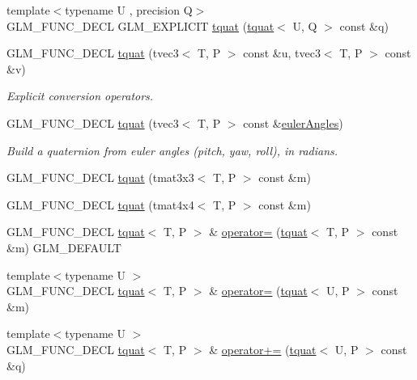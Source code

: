 \begin{DoxyCompactItemize}
\item 
{\footnotesize template$<$typename U , precision Q$>$ }\\G\+L\+M\+\_\+\+F\+U\+N\+C\+\_\+\+D\+E\+C\+L G\+L\+M\+\_\+\+E\+X\+P\+L\+I\+C\+I\+T \hyperlink{structglm_1_1tquat_a2595e543aea979bd7db792af742d62d4}{tquat} (\hyperlink{structglm_1_1tquat}{tquat}$<$ U, Q $>$ const \&q)
\item 
G\+L\+M\+\_\+\+F\+U\+N\+C\+\_\+\+D\+E\+C\+L \hyperlink{structglm_1_1tquat_a5c680cd9a6e7de9e5b0fc2e9e096e6a7}{tquat} (tvec3$<$ T, P $>$ const \&u, tvec3$<$ T, P $>$ const \&v)
\begin{DoxyCompactList}\small\item\em Explicit conversion operators. \end{DoxyCompactList}\item 
G\+L\+M\+\_\+\+F\+U\+N\+C\+\_\+\+D\+E\+C\+L \hyperlink{structglm_1_1tquat_a9841cfe16ccfb909c4c2cd0956f2d42b}{tquat} (tvec3$<$ T, P $>$ const \&\hyperlink{group__gtc__quaternion_gadb92ec1c1b0dd6b024176a73fbef3e64}{euler\+Angles})
\begin{DoxyCompactList}\small\item\em Build a quaternion from euler angles (pitch, yaw, roll), in radians. \end{DoxyCompactList}\item 
G\+L\+M\+\_\+\+F\+U\+N\+C\+\_\+\+D\+E\+C\+L \hyperlink{structglm_1_1tquat_a56ea9f0ac327fc40f99821fd8e0816f8}{tquat} (tmat3x3$<$ T, P $>$ const \&m)
\item 
G\+L\+M\+\_\+\+F\+U\+N\+C\+\_\+\+D\+E\+C\+L \hyperlink{structglm_1_1tquat_a738e6d5bcc5a75cca8ac119edafaeafa}{tquat} (tmat4x4$<$ T, P $>$ const \&m)
\item 
G\+L\+M\+\_\+\+F\+U\+N\+C\+\_\+\+D\+E\+C\+L \hyperlink{structglm_1_1tquat}{tquat}$<$ T, P $>$ \& \hyperlink{structglm_1_1tquat_a19b252f704a5d0cb43df15cd3a8b545e}{operator=} (\hyperlink{structglm_1_1tquat}{tquat}$<$ T, P $>$ const \&m) G\+L\+M\+\_\+\+D\+E\+F\+A\+U\+L\+T
\item 
{\footnotesize template$<$typename U $>$ }\\G\+L\+M\+\_\+\+F\+U\+N\+C\+\_\+\+D\+E\+C\+L \hyperlink{structglm_1_1tquat}{tquat}$<$ T, P $>$ \& \hyperlink{structglm_1_1tquat_af00985afe704157487281c4c3eb4f790}{operator=} (\hyperlink{structglm_1_1tquat}{tquat}$<$ U, P $>$ const \&m)
\item 
{\footnotesize template$<$typename U $>$ }\\G\+L\+M\+\_\+\+F\+U\+N\+C\+\_\+\+D\+E\+C\+L \hyperlink{structglm_1_1tquat}{tquat}$<$ T, P $>$ \& \hyperlink{structglm_1_1tquat_a6a659798636ad7f9d8cb392904b61020}{operator+=} (\hyperlink{structglm_1_1tquat}{tquat}$<$ U, P $>$ const \&q)

\end{DoxyCompactItemize}
